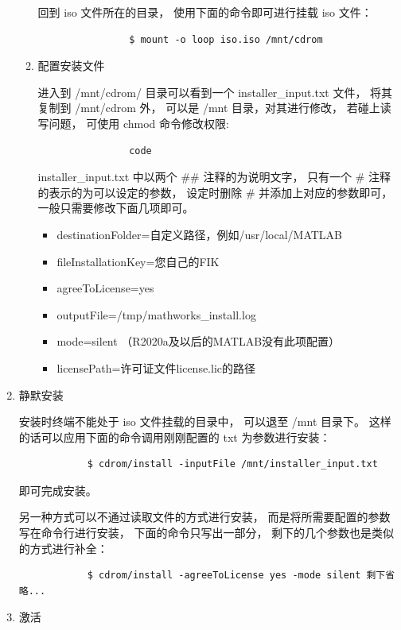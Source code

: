 \documentclass[UTF8]{article}   %
\numberwithin{equation}{section} %
\begin{document}
\begin{enumerate}
\begin{enumerate}
			回到 iso 文件所在的目录，
			使用下面的命令即可进行挂载 iso 文件：
			\begin{verbatim}
				$ mount -o loop iso.iso /mnt/cdrom
			\end{verbatim}

		\item 配置安装文件

			进入到 /mnt/cdrom/ 目录可以看到一个 installer_input.txt 文件，
			将其复制到 /mnt/cdrom 外， 
			可以是 /mnt 目录，对其进行修改，
			若碰上读写问题，
			可使用 chmod 命令修改权限:
			\begin{verbatim}
				code
			\end{verbatim}

			installer_input.txt 中以两个 \#\# 注释的为说明文字，
			只有一个 \# 注释的表示的为可以设定的参数，
			设定时删除 \# 并添加上对应的参数即可，
			一般只需要修改下面几项即可。

			\begin{itemize}
				\item destinationFolder=自定义路径，例如/usr/local/MATLAB
				\item fileInstallationKey=您自己的FIK
				\item agreeToLicense=yes
				\item outputFile=/tmp/mathworks_install.log
				\item mode=silent （R2020a及以后的MATLAB没有此项配置）
				\item licensePath=许可证文件license.lic的路径
			\end{itemize}


		\end{enumerate}
	\item 静默安装

		安装时终端不能处于 iso 文件挂载的目录中，
		可以退至 /mnt 目录下。
		这样的话可以应用下面的命令调用刚刚配置的 txt 为参数进行安装：
		\begin{verbatim}
			$ cdrom/install -inputFile /mnt/installer_input.txt 
		\end{verbatim}
		
		即可完成安装。

		另一种方式可以不通过读取文件的方式进行安装，
		而是将所需要配置的参数写在命令行进行安装，
		下面的命令只写出一部分，
		剩下的几个参数也是类似的方式进行补全：
		\begin{verbatim}
			$ cdrom/install -agreeToLicense yes -mode silent 剩下省略...
		\end{verbatim}
	\item 激活


\end{enumerate}
\end{document}
